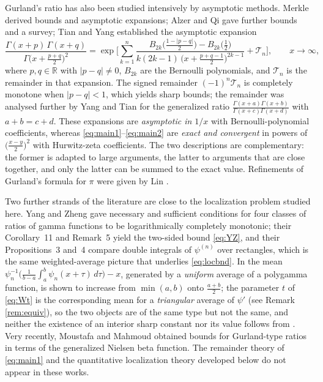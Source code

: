 \documentclass[11pt,a4paper]{amsart}
\theoremstyle{definition}
\newcommand{\R}{\mathbb{R}}
\begin{document}
Gurland's ratio has also been studied intensively by asymptotic methods. Merkle
\cite{Merkle05} derived bounds and asymptotic expansions; Alzer \cite{Alzer97} and Qi
\cite{Qi10} gave further bounds and a survey; Tian and Yang \cite{TianYang21} established
the asymptotic expansion
\[
  \frac{\Gamma(x+p)\,\Gamma(x+q)}{\Gamma\big(x+\frac{p+q}{2}\big)^{2}}
   =\exp\Big[\sum_{k=1}^{n}\frac{B_{2k}\big(\frac{1-|p-q|}{2}\big)
   -B_{2k}\big(\frac12\big)}
   {k(2k-1)\,\big(x+\frac{p+q-1}{2}\big)^{2k-1}}+\mathcal{T}_{n}\Big],
   \qquad x\to\infty ,
\]
where $p,q\in\R$ with $|p-q|\ne0$, $B_{2k}$ are the Bernoulli polynomials, and
$\mathcal{T}_{n}$ is the remainder in that expansion. The signed remainder
$(-1)^{n}\mathcal{T}_{n}$ is completely monotone when $|p-q|<1$, which yields sharp
bounds; the remainder was analysed
further by Yang and Tian \cite{YangTian24} for the
generalized ratio $\frac{\Gamma(x+a)\Gamma(x+b)}{\Gamma(x+c)\Gamma(x+d)}$ with
$a+b=c+d$. These expansions are \emph{asymptotic in $1/x$} with Bernoulli-polynomial
coefficients, whereas \eqref{eq:main1}--\eqref{eq:main2} are \emph{exact and convergent}
in powers of $\big(\frac{x-y}{2}\big)^{2}$ with Hurwitz-zeta coefficients. The two
descriptions are complementary: the former is adapted to large arguments, the latter to
arguments that are close together, and only the latter can be summed to the exact value.
Refinements of Gurland's formula for $\pi$ were given by Lin \cite{Lin13}.

Two further strands of the literature are close to the localization problem studied here.
Yang and Zheng \cite{YangZheng19} gave necessary and sufficient conditions for four classes
of ratios of gamma functions to be logarithmically completely monotonic; their
Corollary~11 and Remark~5 yield the two-sided bound \eqref{eq:YZ}, and their
Propositions~3 and~4 compare double integrals of $\psi^{(n)}$ over rectangles, which is the
same weighted-average picture that underlies \eqref{eq:locbnd}. In \cite{YangZheng16} the
mean $\psi_{n}^{-1}\big(\frac{1}{b-a}\int_{a}^{b}\psi_{n}(x+\tau)\,d\tau\big)-x$, generated
by a \emph{uniform} average of a polygamma function, is shown to increase from $\min(a,b)$
onto $\frac{a+b}{2}$; the parameter $t$ of \eqref{eq:Wt} is the corresponding mean for a
\emph{triangular} average of $\psi'$ (see Remark \ref{rem:equiv}), so the two objects are of
the same type but not the same, and neither the existence of an interior sharp constant nor
its value follows from \cite{YangZheng16}. Very recently, Moustafa and Mahmoud
\cite{MoustafaMahmoud26} obtained bounds for Gurland-type ratios in terms of the generalized
Nielsen beta function. The remainder theory of \eqref{eq:main1} and the quantitative
localization theory developed below do not appear in these works.
\end{document}
